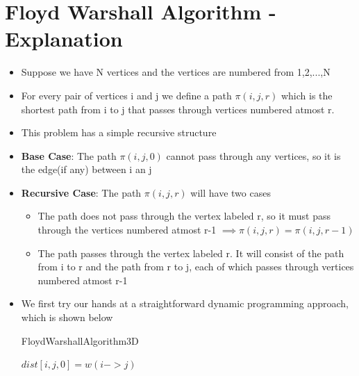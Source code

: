 \documentclass[12pt,letterpaper,titlepage,en-US]{article}
\begin{document}
\section{Floyd Warshall Algorithm - Explanation}
\begin{itemize}
\item Suppose we have N vertices and the vertices are numbered from 1,2,...,N

\item For every pair of vertices i and j we define a path $\pi(i,j,r)$ which is  the shortest path from i to j that passes through vertices numbered atmost r.

\item This problem has a simple recursive structure

\item \textbf{Base Case}: The path $\pi(i,j,0)$ cannot pass through any vertices, so it is the edge(if any) between i an j

\item \textbf{Recursive Case}: The path $\pi(i,j,r)$ will have two cases
\begin{itemize}
\item The path does not pass through the vertex labeled r, so it must pass through the vertices numbered atmost r-1 $\implies \pi(i,j,r) = \pi(i,j,r-1)$

\item The path passes through the vertex labeled r. It will consist of the path from i to r and the path from r to j, each of which passes through vertices numbered atmost r-1 



\end{itemize}


\item We first try our hands at a straightforward dynamic programming approach, which is shown below

\begin{algorithm}[H]
    \caption{FloydWarshallAlgorithm3D}
    \begin{algorithmic}[1]
      
        \State $dist[i,j,0]=w( i-> j)$
        \EndFor
        \EndFor
        
         
        

\end{algorithmic}
\end{algorithm}
\end{itemize}
\end{document}
